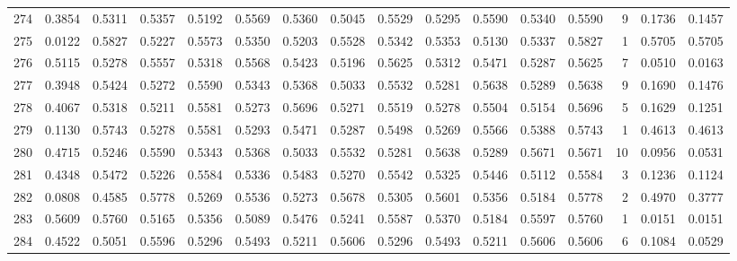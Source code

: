 \begin{tabular}{lrrrrrrrrrrrrrrr}
274 &      0.3854 &  0.5311 &  0.5357 &  0.5192 &  0.5569 &  0.5360 &  0.5045 &  0.5529 &  0.5295 &  0.5590 &   0.5340 &     0.5590 &      9 &                    0.1736 &                     0.1457 \\
275 &      0.0122 &  0.5827 &  0.5227 &  0.5573 &  0.5350 &  0.5203 &  0.5528 &  0.5342 &  0.5353 &  0.5130 &   0.5337 &     0.5827 &      1 &                    0.5705 &                     0.5705 \\
276 &      0.5115 &  0.5278 &  0.5557 &  0.5318 &  0.5568 &  0.5423 &  0.5196 &  0.5625 &  0.5312 &  0.5471 &   0.5287 &     0.5625 &      7 &                    0.0510 &                     0.0163 \\
277 &      0.3948 &  0.5424 &  0.5272 &  0.5590 &  0.5343 &  0.5368 &  0.5033 &  0.5532 &  0.5281 &  0.5638 &   0.5289 &     0.5638 &      9 &                    0.1690 &                     0.1476 \\
278 &      0.4067 &  0.5318 &  0.5211 &  0.5581 &  0.5273 &  0.5696 &  0.5271 &  0.5519 &  0.5278 &  0.5504 &   0.5154 &     0.5696 &      5 &                    0.1629 &                     0.1251 \\
279 &      0.1130 &  0.5743 &  0.5278 &  0.5581 &  0.5293 &  0.5471 &  0.5287 &  0.5498 &  0.5269 &  0.5566 &   0.5388 &     0.5743 &      1 &                    0.4613 &                     0.4613 \\
280 &      0.4715 &  0.5246 &  0.5590 &  0.5343 &  0.5368 &  0.5033 &  0.5532 &  0.5281 &  0.5638 &  0.5289 &   0.5671 &     0.5671 &     10 &                    0.0956 &                     0.0531 \\
281 &      0.4348 &  0.5472 &  0.5226 &  0.5584 &  0.5336 &  0.5483 &  0.5270 &  0.5542 &  0.5325 &  0.5446 &   0.5112 &     0.5584 &      3 &                    0.1236 &                     0.1124 \\
282 &      0.0808 &  0.4585 &  0.5778 &  0.5269 &  0.5536 &  0.5273 &  0.5678 &  0.5305 &  0.5601 &  0.5356 &   0.5184 &     0.5778 &      2 &                    0.4970 &                     0.3777 \\
283 &      0.5609 &  0.5760 &  0.5165 &  0.5356 &  0.5089 &  0.5476 &  0.5241 &  0.5587 &  0.5370 &  0.5184 &   0.5597 &     0.5760 &      1 &                    0.0151 &                     0.0151 \\
284 &      0.4522 &  0.5051 &  0.5596 &  0.5296 &  0.5493 &  0.5211 &  0.5606 &  0.5296 &  0.5493 &  0.5211 &   0.5606 &     0.5606 &      6 &                    0.1084 &                     0.0529 \\

\end{tabular}
